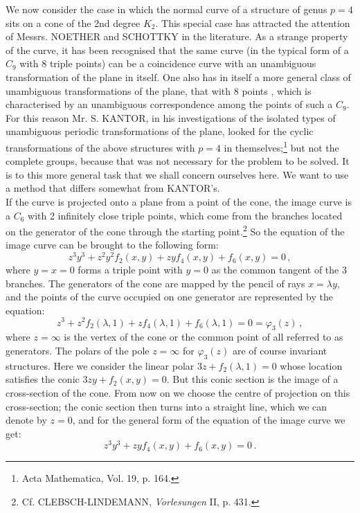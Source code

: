 \documentclass[leqno]{article}
\begin{document}
We now consider the case in which the normal curve of a structure of genus $p=4$ sits on a cone of the 2nd degree $K_2$. This special case has attracted the attention of Messrs. NOETHER and SCHOTTKY in the literature. As a strange property of the curve, it has been recognised that the same curve (in the typical form of a $C_9$ with 8 triple points) can be a coincidence curve with an unambiguous transformation of the plane in itself. One also has in itself a more general class of unambiguous transformations of the plane, that \guillemotright with 8 points \guillemotright, which is characterised by an unambiguous correspondence among the points  of such a $C_9$. For this reason Mr. S. KANTOR, in his investigations of the isolated types of unambiguous periodic transformations of the plane, looked for the cyclic transformations of the above structures with $p=4$ in themselves;\footnote{Acta Mathematica, Vol. 19, p. 164.} but not the complete groups, because that was not necessary for the problem to be solved. It is to this more general task that we shall concern ourselves here. We want to use a method that differs somewhat from KANTOR's. \\
If the curve is projected onto a plane from a point of the cone, the image curve is a $C_6$ with 2 infinitely close triple points, which come from the branches located on the generator of the cone through the starting point.\footnote{Cf. CLEBSCH-LINDEMANN, \textit{Vorlesungen} II, p. 431.} So the equation of the image curve can be brought to the following form: 
\[
z^3 y^3 + z^2 y^2 f_2(x,y) + zy f_4(x,y)+ f_6(x,y) = 0 \, , 
\]
where $y=x=0$ forms a triple point with $y=0$ as the common tangent of the 3 branches. The generators of the cone are mapped by the pencil of rays $x=\lambda y$, and the points of the curve occupied on one generator are represented by the equation: 
\[
z^3 + z^2 f_2(\lambda, 1) + z f_4(\lambda, 1) + f_6(\lambda, 1) = 0 = \varphi_3(z) \, , 
\] 
where $z=\infty$ is the vertex of the cone or the common point of all referred to as generators. The polars of the pole $z=\infty$ for $\varphi_3(z)$ are of course invariant structures. Here we consider the linear polar $3z + f_2(\lambda, 1)=0$ whose location satisfies the conic $3zy+f_2(x,y)=0$. But this conic section is the image of a cross-section of the cone. From now on we choose the centre of projection on this cross-section; the conic section then turns into a straight line, which we can denote by $z=0$, and for the general form of the equation of the image curve we get:
\begin{equation}\label{eq: 8.I}
z^3 y^3 + zy f_4(x,y) + f_6(x,y) = 0 \, . \tag{I}
\end{equation}
\end{document}
